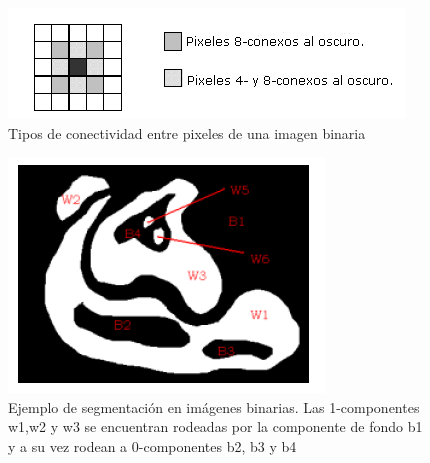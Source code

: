 	\begin{figure}[tpb]
\begin{center}
  \includegraphics[scale=0.6]{figuras/48conexos.png}
\end{center}
  \caption{\small Tipos de conectividad entre pixeles de una imagen binaria}
  \label{fig:conectividad}
\end{figure}

\begin{figure}[tpb]
\begin{center}
  \includegraphics[scale=0.6]{figuras/zonas-contours.png}
\end{center}
  \caption{\small Ejemplo de segmentación en imágenes binarias. Las 1-componentes w1,w2 y w3 se encuentran rodeadas por la componente de fondo b1 y a su vez
  rodean a 0-componentes b2, b3 y b4 }
  \label{fig:contours}
\end{figure}
	
	
